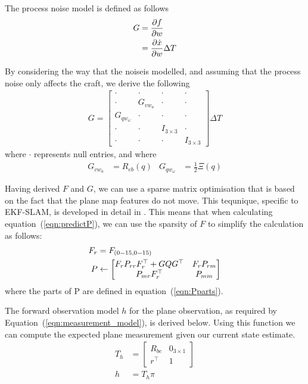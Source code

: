 \documentclass[]{article}
\begin{document}
{The process noise model is defined as follows
\begin{align}
	G &= \frac{\partial f}{\partial w} \notag \\
	&=
	\frac{\partial \dot{x}}{\partial w} \Delta T
\end{align}

By considering the way that the noiseis modelled, and assuming that the process noise only affects the craft, we derive the following
\begin{align}
	G = \left[
	\begin{matrix}
		\cdot 			& \cdot 	& \cdot 		& \cdot \\
		\cdot 			& G_{vw_a} 	& \cdot 		& \cdot \\
		G_{qw_\omega}	& \cdot 	& \cdot 		& \cdot \\
		\cdot 			& \cdot 	& I_{3\times3}	& \cdot \\
		\cdot 			& \cdot 	& \cdot 		& I_{3\times3}
	\end{matrix}
	\right]
	\Delta T
\end{align}
where $\cdot$ represents null entries, and where
\begin{align}
	G_{vw_a} &= R_{eb}(q)
&
	G_{qw_\omega} &= \frac{1}{2} \Xi(q)
\end{align}

Having derived $F$ and $G$, we can use a sparse matrix optimisation that is based on the fact that the plane map features do not move. This tequnique, specific to EKF-SLAM, is developed in detail in \cite{Sola2013}.
This means that when calculating equation~(\ref{eqn:predictP}), we can use the sparsity of $F$ to simplify the calculation as follows:
\begin{align}
	F_r &= F_{(0-15,0-15)} \notag \\
	P &\leftarrow
	\left[
	\begin{matrix}
		F_r P_{rr} F_r^\top + GQG^\top 	& F_r P_{rm} \\
		P_{mr} F_r^\top 				& P_{mm}
	\end{matrix}
	\right]
\end{align}
where the parts of P are defined in equation~(\ref{eqn:Pparts}).

The forward observation model $h$ for the plane observation, as required by Equation~(\ref{eqn:measurement_model}), is derived below. Using this function we can compute the expected plane measurement given our current state estimate.
\begin{align}
	T_h &= 
	\left[
	\begin{matrix}
		R_{be} 	& 0_{3\times1} \\
		r^\top 	& 1
	\end{matrix}
	\right]
	\\
	h &= T_h \pi
\end{align}

}
\end{document}
